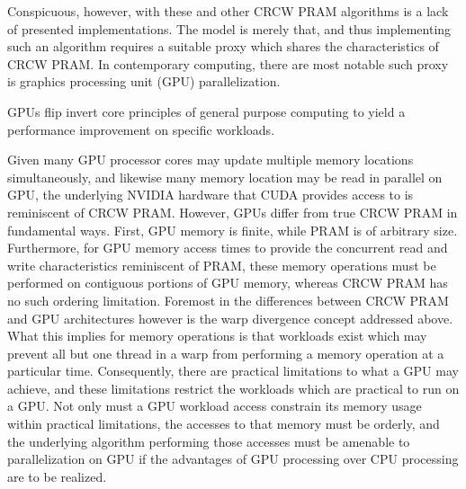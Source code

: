 \documentclass[letterpaper, 12pt]{article}
\begin{document}
Conspicuous, however, with these and other CRCW PRAM algorithms is a lack of presented implementations.  The model is merely that, and thus implementing such an algorithm requires a suitable proxy which shares the characteristics of CRCW PRAM.  In contemporary computing, there are most notable such proxy is graphics processing unit (GPU) parallelization.

GPUs flip invert core principles of general purpose computing to yield a performance improvement on specific workloads.   

Given many GPU processor cores may update multiple memory locations simultaneously, and likewise many memory location may be read in parallel on GPU, the underlying NVIDIA hardware that CUDA provides access to is reminiscent of CRCW PRAM.  However, GPUs differ from true CRCW PRAM in fundamental ways.  First, GPU memory is finite, while PRAM is of arbitrary size.  Furthermore, for GPU memory access times to provide the concurrent read and write characteristics reminiscent of PRAM, these memory operations must be performed on contiguous portions of GPU memory, whereas CRCW PRAM has no such ordering limitation.  Foremost in the differences between CRCW PRAM and GPU architectures however is the warp divergence concept addressed above.  What this implies for memory operations is that workloads exist which may prevent all but one thread in a warp from performing a memory operation at a particular time.  Consequently, there are practical limitations to what a GPU may achieve, and these limitations restrict the workloads which are practical to run on a GPU.  Not only must a GPU workload access constrain its memory usage within practical limitations, the accesses to that memory must be orderly, and the underlying algorithm performing those accesses must be amenable to parallelization on GPU if the advantages of GPU processing over CPU processing are to be realized\cite{dehne2010}.




\nocite{*}
\end{document}

